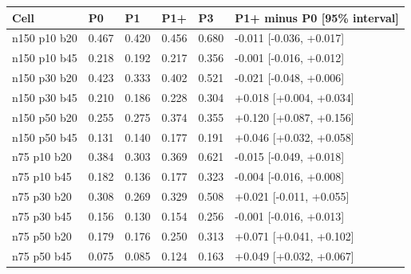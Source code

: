 \begin{tabular}{llllll}
\hline
Cell & P0 & P1 & P1+ & P3 & P1+ minus P0 [95\% interval] \\
\hline
n150 p10 b20 & 0.467 & 0.420 & 0.456 & 0.680 & -0.011 [-0.036, +0.017] \\
n150 p10 b45 & 0.218 & 0.192 & 0.217 & 0.356 & -0.001 [-0.016, +0.012] \\
n150 p30 b20 & 0.423 & 0.333 & 0.402 & 0.521 & -0.021 [-0.048, +0.006] \\
n150 p30 b45 & 0.210 & 0.186 & 0.228 & 0.304 & +0.018 [+0.004, +0.034] \\
n150 p50 b20 & 0.255 & 0.275 & 0.374 & 0.355 & +0.120 [+0.087, +0.156] \\
n150 p50 b45 & 0.131 & 0.140 & 0.177 & 0.191 & +0.046 [+0.032, +0.058] \\
n75 p10 b20 & 0.384 & 0.303 & 0.369 & 0.621 & -0.015 [-0.049, +0.018] \\
n75 p10 b45 & 0.182 & 0.136 & 0.177 & 0.323 & -0.004 [-0.016, +0.008] \\
n75 p30 b20 & 0.308 & 0.269 & 0.329 & 0.508 & +0.021 [-0.011, +0.055] \\
n75 p30 b45 & 0.156 & 0.130 & 0.154 & 0.256 & -0.001 [-0.016, +0.013] \\
n75 p50 b20 & 0.179 & 0.176 & 0.250 & 0.313 & +0.071 [+0.041, +0.102] \\
n75 p50 b45 & 0.075 & 0.085 & 0.124 & 0.163 & +0.049 [+0.032, +0.067] \\
\hline
\end{tabular}
